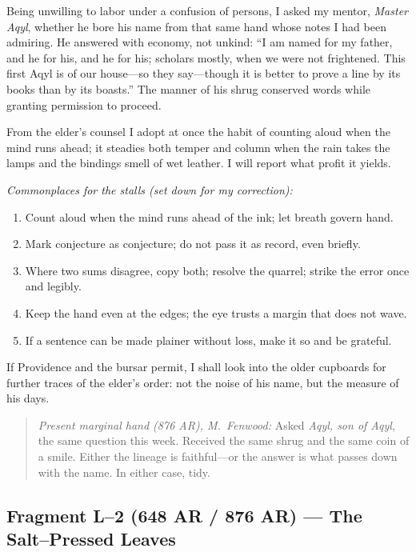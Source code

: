 \documentclass[11pt]{article}
\begin{document}
Being unwilling to labor under a confusion of persons, I asked my mentor, \textit{Master Aqyl}, whether he bore his name from that same hand whose notes I had been admiring. He answered with economy, not unkind: “I am named for my father, and he for his, and he for his; scholars mostly, when we were not frightened. This first Aqyl is of our house—so they say—though it is better to prove a line by its books than by its boasts.” The manner of his shrug conserved words while granting permission to proceed.

From the elder’s counsel I adopt at once the habit of counting aloud when the mind runs ahead; it steadies both temper and column when the rain takes the lamps and the bindings smell of wet leather. I will report what profit it yields.

\medskip
\noindent\textit{Commonplaces for the stalls (set down for my correction):}
\begin{enumerate}\setlength\itemsep{0.25em}
  \item Count aloud when the mind runs ahead of the ink; let breath govern hand.
  \item Mark conjecture as conjecture; do not pass it as record, even briefly.
  \item Where two sums disagree, copy both; resolve the quarrel; strike the error once and legibly.
  \item Keep the hand even at the edges; the eye trusts a margin that does not wave.
  \item If a sentence can be made plainer without loss, make it so and be grateful.
\end{enumerate}

If Providence and the bursar permit, I shall look into the older cupboards for further traces of the elder’s order: not the noise of his name, but the measure of his days.

\medskip
\begin{quote}\small
\textit{Present marginal hand (876 AR), M.\ Fenwood:} Asked \textit{Aqyl, son of Aqyl}, the same question this week. Received the same shrug and the same coin of a smile. Either the lineage is faithful—or the answer is what passes down with the name. In either case, tidy.
\end{quote}

\subsection{Fragment L--2 (648 AR / 876 AR) — The Salt–Pressed Leaves}
\label{frag:l2}
\end{document}
